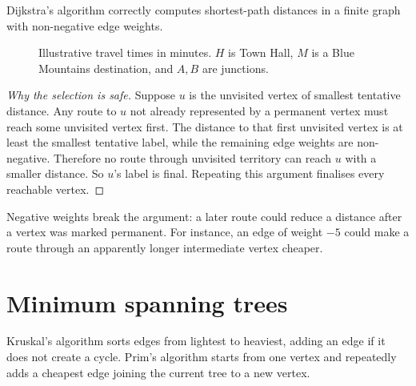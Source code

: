\begin{theorem}
Dijkstra's algorithm correctly computes shortest-path distances in a finite graph with non-negative edge weights.
\end{theorem}
\begin{figure}[htbp]
\centering
{}
\caption{Illustrative travel times in minutes. $H$ is Town Hall, $M$ is a Blue Mountains destination, and $A,B$ are junctions.}
\end{figure}
\begin{proof}[Why the selection is safe]
Suppose $u$ is the unvisited vertex of smallest tentative distance. Any route to $u$ not already represented by a permanent vertex must reach some unvisited vertex first. The distance to that first unvisited vertex is at least the smallest tentative label, while the remaining edge weights are non-negative. Therefore no route through unvisited territory can reach $u$ with a smaller distance. So $u$'s label is final. Repeating this argument finalises every reachable vertex.
\end{proof}

Negative weights break the argument: a later route could reduce a distance after a vertex was marked permanent. For instance, an edge of weight $-5$ could make a route through an apparently longer intermediate vertex cheaper.

\section{Minimum spanning trees}
Kruskal's algorithm sorts edges from lightest to heaviest, adding an edge if it does not create a cycle. Prim's algorithm starts from one vertex and repeatedly adds a cheapest edge joining the current tree to a new vertex.

